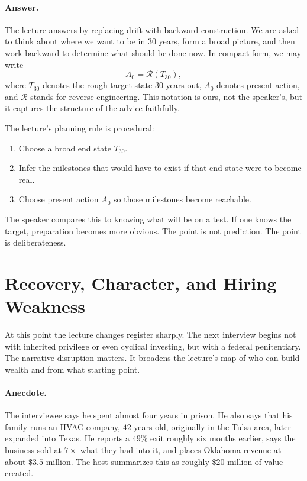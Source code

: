 \paragraph{Answer.} The lecture answers by replacing drift with backward construction. We are asked to think about where we want to be in \(30\) years, form a broad picture, and then work backward to determine what should be done now. In compact form, we may write
\begin{equation}
A_0 = \mathcal{R}(T_{30}),
\end{equation}
where \(T_{30}\) denotes the rough target state \(30\) years out, \(A_0\) denotes present action, and \(\mathcal{R}\) stands for reverse engineering. This notation is ours, not the speaker's, but it captures the structure of the advice faithfully.

The lecture's planning rule is procedural:
\begin{enumerate}
\item Choose a broad end state \(T_{30}\).
\item Infer the milestones that would have to exist if that end state were to become real.
\item Choose present action \(A_0\) so those milestones become reachable.
\end{enumerate}

The speaker compares this to knowing what will be on a test. If one knows the target, preparation becomes more obvious. The point is not prediction. The point is deliberateness.

\section{Recovery, Character, and Hiring Weakness}

At this point the lecture changes register sharply. The next interview begins not with inherited privilege or even cyclical investing, but with a federal penitentiary. The narrative disruption matters. It broadens the lecture's map of who can build wealth and from what starting point.

\paragraph{Anecdote.} The interviewee says he spent almost four years in prison. He also says that his family runs an HVAC company, \(42\) years old, originally in the Tulsa area, later expanded into Texas. He reports a \(49\%\) exit roughly six months earlier, says the business sold at \(7\times\) what they had into it, and places Oklahoma revenue at about \(\$3.5\) million. The host summarizes this as roughly \(\$20\) million of value created.

